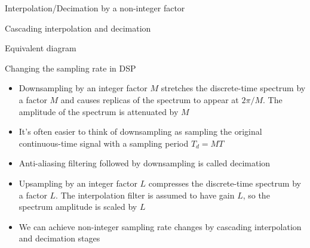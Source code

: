 \documentclass[10pt, aspectratio=169]{beamer}
\begin{document}
\begin{frame}{Interpolation/Decimation by a non-integer factor}

\begin{block}{Cascading interpolation and decimation}
	\vspace{-0.5cm}
	\begin{center}
		\resizebox{\linewidth}{!}{}
	\end{center}
\end{block}
\vspace{-0.5cm}
\begin{block}{Equivalent diagram}
	\begin{center}
		\resizebox{0.8\linewidth}{!}{}
	\end{center}
\end{block}
\end{frame}

%
\begin{frame}{Changing the sampling rate in DSP}
\begin{itemize}
	\item Downsampling by an integer factor $M$ stretches the discrete-time spectrum by a factor $M$ and causes replicas of the spectrum to appear at $2\pi/M$. The amplitude of the spectrum is attenuated by $M$
	\item It's often easier to think of downsampling as sampling the original continuous-time signal with a sampling period $T_d = MT$
	\item Anti-aliasing filtering followed by downsampling is called decimation
	\item Upsampling by an integer factor $L$ compresses the discrete-time spectrum by a factor $L$. The interpolation filter is assumed to have gain $L$, so the spectrum amplitude is scaled by $L$
	\item We can achieve non-integer sampling rate changes by cascading interpolation and decimation stages
\end{itemize}
\end{frame}

%
\end{document}
